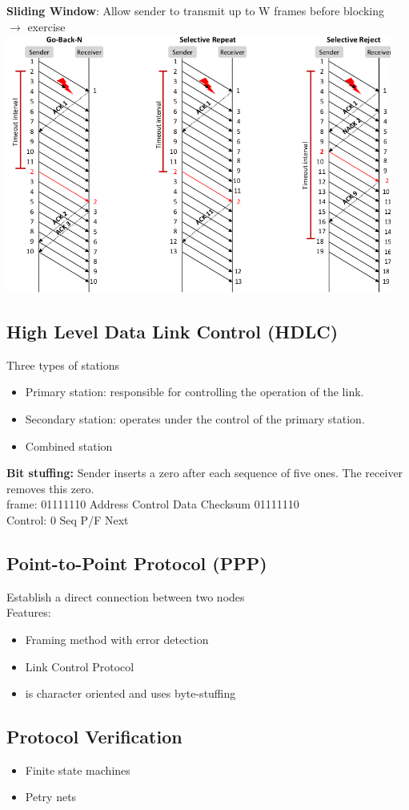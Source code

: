 \documentclass[11pt,ngerman]{article}
\begin{document}
\textbf{Sliding Window}: Allow	sender	to	transmit	up	to	W
frames	before	blocking\\
 $\rightarrow$ exercise\\
\includegraphics[width=5in]{images/Selection_017.png}

\subsection{High	Level	Data	Link	Control	(HDLC)}
Three	types	of	stations
\begin{itemize}[noitemsep]
\item Primary	station:	responsible	for	controlling	the	operation	of	the	link.	
\item Secondary	station:	operates	under	the	control	of	the	primary	station.	
\item Combined	station
\end{itemize}

\textbf{Bit stuffing:} Sender	inserts	a	zero	after	each	sequence	of	five	ones.	The	receiver	removes	this	
zero.\\
frame: 01111110 Address Control Data Checksum 01111110 \\
Control: 0 Seq P/F Next

\subsection{Point-to-Point	Protocol	(PPP)}
Establish	a	direct	connection	between	two	nodes\\
Features:
\begin{itemize}[noitemsep]
\item Framing	method	with	error	detection
\item Link	Control	Protocol
\item is	character	oriented	and	uses	byte-stuffing
\end{itemize}

\subsection{Protocol Verification}
\begin{itemize}[noitemsep]
\item Finite	state	machines
\item Petry nets
\end{itemize}
\end{document}
